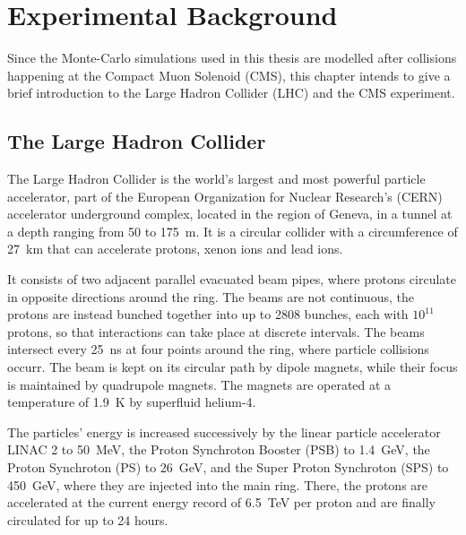 \chapter{Experimental Background}
\label{ch:experiment}
Since the Monte-Carlo simulations used in this thesis are modelled after collisions happening at the Compact Muon Solenoid (CMS), this chapter intends to give a brief introduction to the Large Hadron Collider (LHC) and the CMS experiment.

\section{The Large Hadron Collider}
The Large Hadron Collider is the world's largest and most powerful particle accelerator, part of the European Organization for Nuclear Research's (CERN) accelerator underground complex, located in the region of Geneva, in a tunnel at a depth ranging from 50 to \SI{175}{m}. It is a circular collider with a circumference of \SI{27}{km} that can accelerate protons, xenon ions and lead ions.

It consists of two adjacent parallel evacuated beam pipes, where protons circulate in opposite directions around the ring. The beams are not continuous, the protons are instead bunched together into up to 2808 bunches, each with $10^{11}$ protons, so that interactions can take place at discrete intervals. The beams intersect every \SI{25}{ns} at four points around the ring, where particle collisions occurr. The beam is kept on its circular path by dipole magnets, while their focus is maintained by quadrupole magnets. The magnets are operated at a temperature of \SI{1.9}{K} by superfluid helium-4.

The particles' energy is increased successively by the linear particle accelerator LINAC 2 to \SI{50}{MeV}, the Proton Synchroton Booster (PSB) to \SI{1.4}{GeV}, the Proton Synchroton (PS) to \SI{26}{GeV}, and the Super Proton Synchroton (SPS) to \SI{450}{GeV}, where they are injected into the main ring. There, the protons are accelerated at the current energy record of \SI{6.5}{TeV} per proton and are finally circulated for up to 24 hours.


